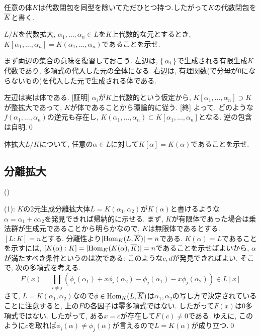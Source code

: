 \begin{theo}
任意の体$K$は代数閉包を同型を除いてただひとつ持つ.したがって$K$の代数閉包を$\overline{K}$と書く.
\end{theo}

\begin{egprob}
$L/K$を代数拡大, $\alpha_1,\dots, \alpha_n\in L$を$K$上代数的な元とするとき, $K[\alpha_1,\dots, \alpha_n] = K(\alpha_1,\dots, \alpha_n)$であることを示せ.
\end{egprob}
\begin{egans}
まず両辺の集合の意味を復習しておこう. 左辺は, $\set{\alpha_i}$で生成される有限生成$K$代数であり, 多項式の代入した元の全体になる. 右辺は, 有理関数(で分母が0にならないもの)を代入した元で生成される体である. \par
左辺は実は体である. [証明] $\alpha_i$が$K$上代数的という仮定から, $K[\alpha_1,\dots, \alpha_n]\supset K$が整拡大であって, $K$が体であることから環論的に従う. [終] よって, どのような$f(\alpha_1,\dots, \alpha_n)$の逆元も存在し, $K(\alpha_1,\dots, \alpha_n)\subset K[\alpha_1,\dots, \alpha_n]$となる. 逆の包含は自明.\qed
\end{egans}

\begin{prac}
体拡大$L/K$について, 任意の$\alpha \in L$に対して$K[\alpha] = K(\alpha)$であることを示せ.
\end{prac}


\subsection{分離拡大}
\begin{prop} ()
\ben
\item {}
\een
\end{prop}
\prf
(1): $K$の2元生成分離拡大体$L=K(\alpha_1,\alpha_2)$が$K(\alpha)$と書けるような$\alpha=\alpha_1+c\alpha_2$を発見できれば帰納的に示せる. まず, $K$が有限体であった場合は乗法群が生成元であることから明らかなので, $K$は無限体であるとする. $[L:K] = n$とする. 分離性より$|\mathrm{Hom}_{K}(L,\overline{K})| = n$である. $K(\alpha) = L$であることを示すには, $[K(\alpha):K] = |\mathrm{Hom}_{K}(K(\alpha), \overline{K})| = n$であることを示せばよいから, $\alpha$が満たすべき条件というのは次である:
このような$c,d$が発見できればよい. そこで, 次の多項式を考える.
\[F(x) = \prod_{i\neq j}(\phi_i(\alpha_1) + x\phi_i(\alpha_2) - \phi_j(\alpha_1) - x\phi_j(\alpha_2)  )\in L[x]\]
さて, $L=K(\alpha_1,\alpha_2)$なので$\phi\in \mathrm{Hom}_{K}(L,\overline{K})$は$\alpha_1,\alpha_2$の写し方で決定されていることに注意すると, 上の$F$の各因子は零多項式ではない. したがって$F(x)$は0多項式ではない. したがって, ある$x=c$が存在して$F(c) \neq 0$である. ゆえに, このように$c$を取れば$\phi_i(\alpha)\neq \phi_j(\alpha)$が言えるので$L=K(\alpha)$が成り立つ.\qed


